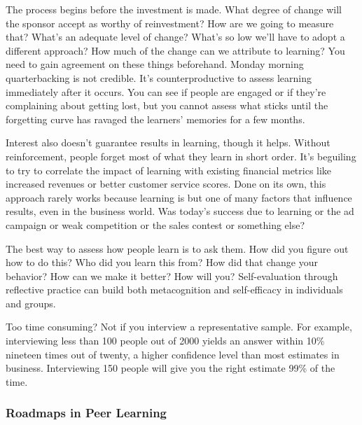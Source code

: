 The process begins before the investment is made. What degree of change
will the sponsor accept as worthy of reinvestment? How are we going to
measure that? What's an adequate level of change? What's so low we'll
have to adopt a different approach? How much of the change can we
attribute to learning? You need to gain agreement on these things
beforehand. Monday morning quarterbacking is not credible. It's
counterproductive to assess learning immediately after it occurs. You
can see if people are engaged or if they're complaining about getting
lost, but you cannot assess what sticks until the forgetting curve has
ravaged the learners' memories for a few months. 

Interest also doesn't
guarantee results in learning, though it helps. Without reinforcement,
people forget most of what they learn in short order. It's beguiling to
try to correlate the impact of learning with existing financial metrics
like increased revenues or better customer service scores. Done on its
own, this approach rarely works because learning is but one of many
factors that influence results, even in the business world. Was today's
success due to learning or the ad campaign or weak competition or the
sales contest or something else? 

The best way to assess how people learn is to ask them. How did you
figure out how to do this? Who did you learn this from? How did that
change your behavior? How can we make it better?  How will you?
Self-evaluation through reflective practice can build both
metacognition and self-efficacy in individuals and groups. 

Too time consuming? Not if you interview a representative sample. For
example, interviewing less than 100 people out of 2000 yields an
answer within 10\% nineteen times out of twenty, a higher confidence
level than most estimates in business. Interviewing 150 people will
give you the right estimate 99\% of the time.

\subsubsection{Roadmaps in Peer Learning}

